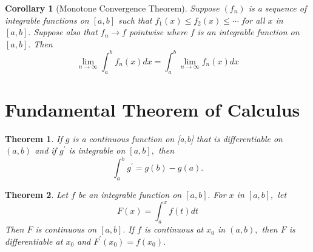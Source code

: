\documentclass[12pt]{article}
\newtheorem{theorem}{Theorem}[section]
\newtheorem{corollary}{Corollary}[theorem]
\begin{document}
\begin{corollary}[Monotone Convergence Theorem]
	Suppose $\left( f _ { n } \right)$ is a sequence of integrable functions on $[ a , b ]$ such that
	$f _ { 1 } ( x ) \leq f _ { 2 } ( x ) \leq \cdots$ for all $x$ in $[ a , b ] .$ Suppose also that $f _ { n } \rightarrow f$
	pointwise where $f$ is an integrable function on $[ a , b ] .$ Then $$
	\lim _ { n \rightarrow \infty } \int _ { a } ^ { b } f _ { n } ( x ) d x = \int _ { a } ^ { b } \lim _ { n \rightarrow \infty } f _ { n } ( x ) d x
	$$
\end{corollary}

\section{Fundamental Theorem of Calculus}
\begin{theorem}
	If $g$ is a continuous function on [a,b] that is differentiable on $( a , b )$
	and if $g ^ { \prime }$ is integrable on $[ a , b ] ,$ then $$
	\int _ { a } ^ { b } g ^ { \prime } = g ( b ) - g ( a )
	.$$
\end{theorem}

\begin{theorem}
	Let $f$ be an integrable function on $[ a , b ] .$ For $x$ in $[ a , b ] ,$ let $$
	F ( x ) = \int _ { a } ^ { x } f ( t ) d t
	$$ Then $F$ is continuous on $[ a , b ] .$ If $f$ is continuous at $x _ { 0 }$ in $( a , b ) ,$ then
	$F$ is differentiable at $x _ { 0 }$ and $F ^ { \prime } \left( x _ { 0 } \right) = f \left( x _ { 0 } \right)$.
\end{theorem}
\end{document}
